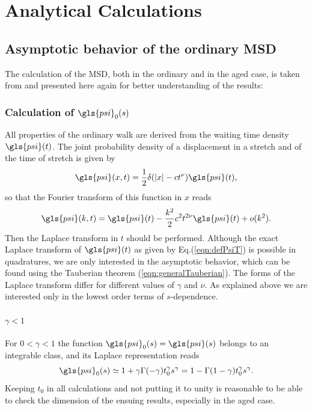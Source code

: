 \chapter{Analytical Calculations}

\section{Asymptotic behavior of the ordinary MSD}

The calculation of the MSD, both in the ordinary and in the aged case, is taken from \cite{bothe} and presented here again for better understanding of the results:

\subsection*{Calculation of $\gls{psi}_0(s)$}
All properties of the ordinary walk are derived from the waiting time density $\gls{psi}(t)$. The joint probability density of a displacement in a stretch and of the time of stretch is given by
%
\begin{equation}
 \gls{psi}(x,t) = \frac{1}{2} \delta(|x| - ct^\nu ) \gls{psi}(t),
\end{equation}
%
so that the Fourier transform of this function in $x$ reads
\begin{equation}
 \gls{psi}(k,t) = \gls{psi}(t) - \frac{k^2}{2} c^2 t^{2 \nu} \gls{psi}(t) + o(k^2). 
\end{equation}
Then the Laplace transform in $t$ should be performed.  Although the exact Laplace transform of $\gls{psi}(t)$ as given by Eq.(\ref{eqn:defPsiT}) is possible in quadratures, we are only interested in the asymptotic behavior, which can be found using the Tauberian theorem (\ref{eqn:generalTauberian}). The forms of the Laplace transform 
differ for different values of $\gamma$ and $\nu$. As explained above we are interested only in the lowest order terms of $s$-dependence. 

\subsubsection*{$ \gamma<1$}
For $0<\gamma <1$ the function $ \gls{psi}_0(s) = \gls{psi}(s)$ belongs to an integrable class, and its Laplace representation reads
\begin{equation}
 \gls{psi}_0(s) \simeq 1 + \gamma \Gamma(-\gamma) t_0^\gamma s^\gamma 
 = 1-\Gamma(1-\gamma) t_0^\gamma s^\gamma. \label{eqn:psi0GammaSmall}
\end{equation}
Keeping $t_0$ in all calculations and not putting it to unity is reasonable to be able to check the dimension of the ensuing results, especially in the aged case. 

